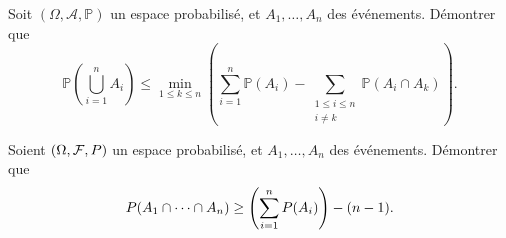 \documentclass[../PolyS4.tex]{subfiles}
\begin{document}
Soit $(\Omega,\mathcal A,\mathbb{P})$ un espace probabilisé, et $A_1,\dots,A_n$ des événements. Démontrer que 
$$\mathbb{P}\left(\bigcup_{i=1}^n A_i\right)\leq \min_{1\leq k\leq n}\left(\sum_{i=1}^n \mathbb{P}(A_i)-\sum_{\substack{1\leq i\leq n\\ i\neq k}}\mathbb{P}(A_i\cap A_k)\right).$$





















Soient $(\Omega,\mathcal F,\mathbb \mathbb{P})$ un espace probabilisé, et $A_1,\dots,A_n$
des événements. Démontrer que 
$$\mathbb \mathbb{P}(A_1\cap\dots\cap A_n)\geq \left(\sum_{i=1}^n \mathbb \mathbb{P}(A_i)\right)-(n-1).$$




\newpage



\end{document}
